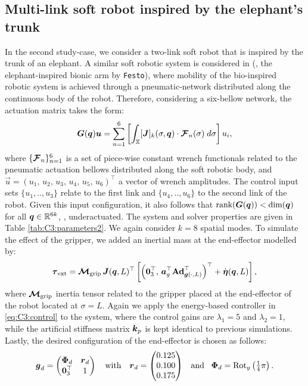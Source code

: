 \subsection{Multi-link soft robot inspired by the elephant's trunk}
In the second study-case, we consider a two-link soft robot that is inspired by the trunk of an elephant. A similar soft robotic system is considered in \cite{Falkenhahn2015} (\ie, the elephant-inspired bionic arm by \texttt{Festo}), where mobility of the bio-inspired robotic system is achieved through a pneumatic-network distributed along the continuous body of the robot. Therefore, considering a six-bellow network, the actuation matrix takes the form:
%
\begin{equation*}
\boldsymbol{G}(\boldsymbol{q})\boldsymbol{u} = \sum_{n=1}^6 \left[ \int_{\mathbb{X}} [\boldsymbol{J}]_k(\sigma,\boldsymbol{q}) \cdot \boldsymbol{\mathcal{F}}_n(\sigma)\; d\sigma\right] u_i,
\end{equation*}
%
where $\{\boldsymbol{\mathcal{F}}_n\}_{n=1}^6$ is a set of piece-wise constant wrench functionals related to the pneumatic actuation bellows distributed along the soft robotic body, and $\vec{u} = (u_1,\,u_2,\,u_3,\,u_4,\,u_5,\,u_6)^\top$ a vector of wrench amplitudes. The control input sets $\{u_1,..,u_3\}$ relate to the first link and $\{u_4,..,u_6\}$ to the second link of the robot. Given this input configuration, it also follows that $\textnormal{rank}(\boldsymbol{G}(\boldsymbol{q})) < \text{dim}(\boldsymbol{q})$ for all $\boldsymbol{q} \in \mathbb{R}^{6k}$, \ie, underactuated. The system and solver properties are given in Table \ref{tab:C3:parameters2}. We again consider $k=8$ spatial modes. To simulate the effect of the gripper, we added an inertial mass at the end-effector modelled by:
%
$$\boldsymbol{\tau}_{\textrm{ext}} =  \boldsymbol{\mathcal{M}}_{\textrm{grip}}\,{\boldsymbol{J}}({\boldsymbol{q}},L)^\top \left[ \left(\boldsymbol{0}_3^\top,\, {\boldsymbol{a}}_g ^\top \textbf{Ad}^\top_{{\boldsymbol{g}}(\cdot,L)} \right)^\top + \dot{{\boldsymbol{\eta}}}({\boldsymbol{q}},L) \right],$$
%
where $\boldsymbol{\mathcal{M}}_{\textrm{grip}}$ inertia tensor related to the gripper placed at the end-effector of the robot located at $\sigma = L$. Again we apply the energy-based controller in \eqref{eq:C3:control} to the system, where the control gains are $\lambda_1 = 5$ and $\lambda_2 = 1$, while the artificial stiffness matrix $\boldsymbol{k}_p$ is kept identical to previous simulations. Lastly, the desired configuration of the end-effector is chosen as follows:
%
\begin{equation*}
\boldsymbol{g}_d = \begin{pmatrix} \boldsymbol{\Phi}_d & \boldsymbol{r}_d \\ \boldsymbol{0}_3^\top & 1 \end{pmatrix} \quad \text{with} \quad \boldsymbol{r}_d = \begin{pmatrix}  0.125 \\ 0.100 \\ 0.175  \end{pmatrix} \;\;\;\text{and} \;\;\; {\boldsymbol{\Phi}}_d = \textrm{Rot}_y\left(\tfrac{1}{4}\pi \right).
\end{equation*}
%

